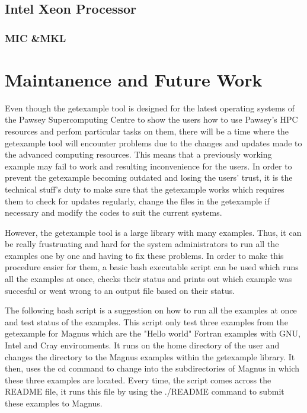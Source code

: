 \documentclass[journal]{IEEEtran}
\begin{document}
\subsection{Intel Xeon Processor}

\subsubsection{MIC &MKL}  


\section{Maintanence and Future Work}

Even though the getexample tool is designed for the latest operating systems of the Pawsey Supercomputing Centre to show the users how to use
Pawsey's HPC resources and perfom particular tasks on them, there will be a time where the getexample tool will encounter problems due 
to the changes and updates made to the advanced computing resources. This means that a previously working example may fail to work and resulting 
inconvenience for the users. In order to prevent the getexample becoming outdated and losing the users' trust, it is the technical stuff's 
duty to make sure that the getexample works which requires them to check for updates regularly, change the files in the getexample if necessary and 
modify the codes to suit the current systems.

However, the getexample tool is a large library with many examples. Thus, it can be really frustruating and hard for the system administrators to run 
all the examples one by one and having to fix these problems. In order to make this procedure easier for them, a basic bash executable script can be 
used which runs all the examples at once, checks their status and prints out which example was succesful or went wrong to an output file based on their
status.

The following bash script is a suggestion on how to run all the examples at once and test status of the examples. This script only test three examples
from the getexample for Magnus which are the "Hello world" Fortran examples with GNU, Intel and Cray environments. It runs on the home directory of the
user and changes the directory to the Magnus examples within the getexample library. It then, uses the cd command to change into the subdirectories of 
Magnus in which these three examples are located. Every time, the script comes across the README file, it runs this file by using the ./README command
to submit these examples to Magnus.
\end{document}
